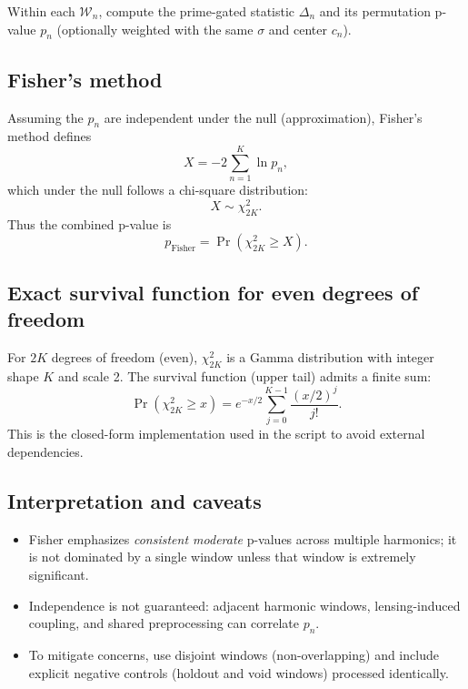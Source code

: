 \documentclass[11pt,a4paper]{article}
\begin{document}
Within each $\mathcal{W}_n$, compute the prime-gated statistic $\Delta_n$ and its
permutation p-value $p_n$ (optionally weighted with the same $\sigma$ and center $c_n$).

\subsection{Fisher's method}
Assuming the $p_n$ are independent under the null (approximation), Fisher's method defines
\begin{equation}
X = -2\sum_{n=1}^{K} \ln p_n,
\end{equation}
which under the null follows a chi-square distribution:
\begin{equation}
X \sim \chi^2_{2K}.
\end{equation}
Thus the combined p-value is
\begin{equation}
p_{\mathrm{Fisher}} = \Pr\left(\chi^2_{2K}\ge X\right).
\end{equation}

\subsection{Exact survival function for even degrees of freedom}
For $2K$ degrees of freedom (even), $\chi^2_{2K}$ is a Gamma distribution with integer
shape $K$ and scale 2. The survival function (upper tail) admits a finite sum:
\begin{equation}
\Pr(\chi^2_{2K}\ge x)=e^{-x/2}\sum_{j=0}^{K-1}\frac{(x/2)^j}{j!}.
\end{equation}
This is the closed-form implementation used in the script to avoid external dependencies.

\subsection{Interpretation and caveats}
\begin{itemize}
\item Fisher emphasizes \emph{consistent moderate} p-values across multiple harmonics;
it is not dominated by a single window unless that window is extremely significant.
\item Independence is not guaranteed: adjacent harmonic windows, lensing-induced coupling,
and shared preprocessing can correlate $p_n$.
\item To mitigate concerns, use disjoint windows (non-overlapping) and include explicit
negative controls (holdout and void windows) processed identically.
\end{itemize}
\end{document}
